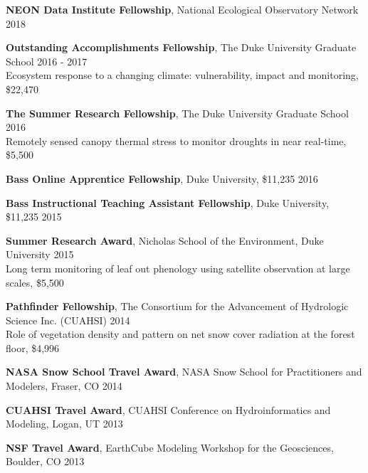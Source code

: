 \documentclass[10pt]{article}
\newenvironment{changemargin}[2]{%
  \begin{list}{}{%
    \setlength{\topsep}{0pt}%
    \setlength{\leftmargin}{#1}%
    \setlength{\rightmargin}{#2}%
    \setlength{\listparindent}{\parindent}%
    \setlength{\itemindent}{\parindent}%
    \setlength{\parsep}{\parskip}%
  }%
  \item[]}{\end{list}
}
\newenvironment{body} {
	\vspace*{-2pt}
	\begin{changemargin}{-0.5in}{-0.5in}
  }
	{\end{changemargin}
}
\begin{document}
\begin{body}

 \textbf{NEON Data Institute Fellowship}, National Ecological Observatory Network  \hfill {2018}\\
 \medskip

\textbf{Outstanding Accomplishments Fellowship}, The Duke University Graduate School \hfill {2016 - 2017}\\
 Ecosystem response to a changing climate: vulnerability, impact and monitoring, \$22,470 \\
 \medskip

 \textbf{The Summer Research Fellowship}, The Duke University Graduate School \hfill {2016}\\
 Remotely sensed canopy thermal stress to monitor droughts in near real-time, \$5,500 \\
 \medskip

  \textbf{Bass Online Apprentice Fellowship}, Duke University, \$11,235 \hfill {2016}\\
 \medskip

  \textbf{Bass Instructional Teaching Assistant Fellowship}, Duke University, \$11,235 \hfill {2015}\\
 \medskip

  \textbf{Summer Research Award}, Nicholas School of the Environment, Duke University \hfill {2015}\\
  Long term monitoring of leaf out phenology using satellite observation at large scales, \$5,500 \\
  \medskip

  \textbf{Pathfinder Fellowship}, The Consortium for the Advancement of Hydrologic Science Inc. (CUAHSI)  \hfill {2014}\\
  Role of vegetation density and pattern on net snow cover radiation at the forest floor, \$4,996\\
  \medskip

	\textbf{NASA Snow School Travel Award},  NASA Snow School for Practitioners and Modelers, Fraser, CO \hfill {2014}\\
	\medskip

	\textbf{CUAHSI Travel Award}, CUAHSI Conference on Hydroinformatics and Modeling, Logan, UT \hfill {2013}\\
	\medskip

	\textbf{NSF Travel Award}, EarthCube Modeling Workshop for the Geosciences, Boulder, CO \hfill {2013}\\ \medskip

\end{body}
\medskip
\end{document}
